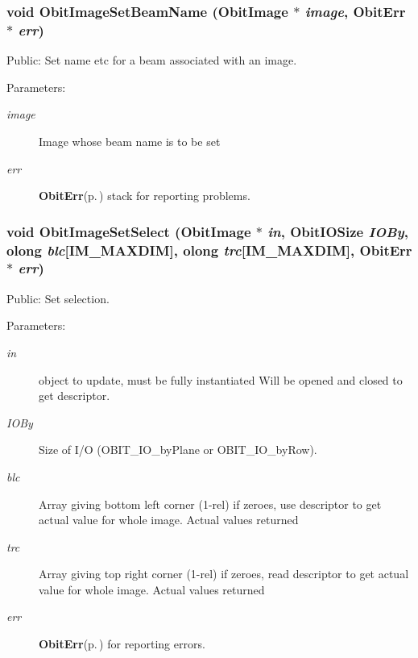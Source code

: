 \subsubsection{\setlength{\rightskip}{0pt plus 5cm}void Obit\-Image\-Set\-Beam\-Name ({\bf Obit\-Image} $\ast$ {\em image}, {\bf Obit\-Err} $\ast$ {\em err})}\label{ObitImage_8h_a39}


Public: Set name etc for a beam associated with an image. 

\begin{Desc}
\item[Parameters:]
\begin{description}
\item[{\em image}]Image whose beam name is to be set \item[{\em err}]{\bf Obit\-Err}{\rm (p.\,\pageref{structObitErr})} stack for reporting problems. \end{description}
\end{Desc}
\subsubsection{\setlength{\rightskip}{0pt plus 5cm}void Obit\-Image\-Set\-Select ({\bf Obit\-Image} $\ast$ {\em in}, Obit\-IOSize {\em IOBy}, {\bf olong} {\em blc}[IM\_\-MAXDIM], {\bf olong} {\em trc}[IM\_\-MAXDIM], {\bf Obit\-Err} $\ast$ {\em err})}\label{ObitImage_8h_a42}


Public: Set selection. 

\begin{Desc}
\item[Parameters:]
\begin{description}
\item[{\em in}]object to update, must be fully instantiated Will be opened and closed to get descriptor. \item[{\em IOBy}]Size of I/O (OBIT\_\-IO\_\-by\-Plane or OBIT\_\-IO\_\-by\-Row). \item[{\em blc}]Array giving bottom left corner (1-rel) if zeroes, use descriptor to get actual value for whole image. Actual values returned \item[{\em trc}]Array giving top right corner (1-rel) if zeroes, read descriptor to get actual value for whole image. Actual values returned \item[{\em err}]{\bf Obit\-Err}{\rm (p.\,\pageref{structObitErr})} for reporting errors. \end{description}
\end{Desc}
